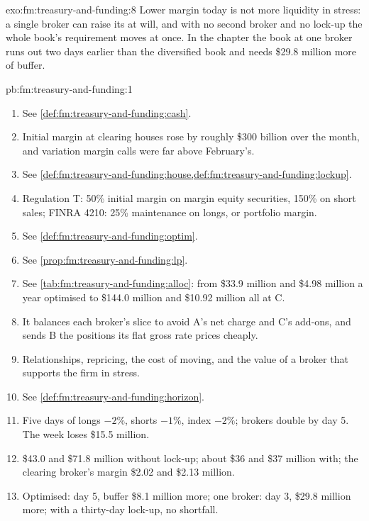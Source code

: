 \begin{solution}{exo:fm:treasury-and-funding:8}
Lower margin today is not more liquidity in stress: a single broker can raise its  at will, and with no second broker and no lock-up
the whole book's requirement moves at once. In the chapter the book at one broker runs out two days earlier than the diversified book and needs
\$29.8 million more of buffer.
\end{solution}

\begin{solution}{pb:fm:treasury-and-funding:1}
\begin{enumerate}
\item See \cref{def:fm:treasury-and-funding:cash}.
\item Initial margin at clearing houses rose by roughly \$300 billion over the month, and variation margin calls were far above February's.
\item See \cref{def:fm:treasury-and-funding:house,def:fm:treasury-and-funding:lockup}.
\item Regulation T: 50\% initial margin on margin equity securities, 150\% on short sales; FINRA 4210: 25\% maintenance on longs, or portfolio
margin.
\item See \cref{def:fm:treasury-and-funding:optim}.
\item See \cref{prop:fm:treasury-and-funding:lp}.
\item See \cref{tab:fm:treasury-and-funding:alloc}: from \$33.9 million and \$4.98 million a year optimised to \$144.0 million and \$10.92 million
all at C.
\item It balances each broker's slice to avoid A's net charge and C's add-ons, and sends B the positions its flat gross rate prices cheaply.
\item Relationships, repricing, the cost of moving, and the value of a broker that supports the firm in stress.
\item See \cref{def:fm:treasury-and-funding:horizon}.
\item Five days of longs $-2\%$, shorts $-1\%$, index $-2\%$; brokers double  by day 5. The week loses \$15.5 million.
\item \$43.0 and \$71.8 million without lock-up; about \$36 and \$37 million with; the clearing broker's margin \$2.02 and \$2.13 million.
\item Optimised: day 5, buffer \$8.1 million more; one broker: day 3, \$29.8 million more; with a thirty-day lock-up, no shortfall.

\end{enumerate}
\end{solution}

